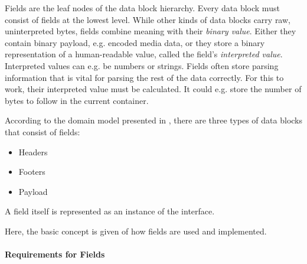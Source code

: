 Fields are the leaf nodes of the data block hierarchy. Every data block must consist of fields at the lowest level. While other kinds of data blocks carry raw, uninterpreted bytes, fields combine meaning with their \emph{binary value}. Either they contain binary payload, e.g. encoded media data, or they store a binary representation of a human-readable value, called the field's \emph{interpreted value}. Interpreted values can e.g. be numbers or strings. Fields often store parsing information that is vital for parsing the rest of the data correctly. For this to work, their interpreted value must be calculated. It could e.g. store the number of bytes to follow in the current container.

According to the domain model presented in , there are three types of data blocks that consist of fields:
\begin{itemize}
	\item Headers
	\item Footers
	\item Payload
\end{itemize}

A field itself is represented as an instance of the \IFField{} interface.

Here, the basic concept is given of how fields are used and implemented.


\paragraph{Requirements for Fields}
\label{sec:RequirementsForFields}

\newcommand{\REQUfieldQueryFields}{\texttt{FIELD\_REQU\_1}}
\newcommand{\REQUfieldInterpValueString}{\texttt{FIELD\_REQU\_2}}
\newcommand{\REQUfieldInterpValueTyped}{\texttt{FIELD\_REQU\_3}}
\newcommand{\REQUfieldBinaryValue}{\texttt{FIELD\_REQU\_4}}
\newcommand{\REQUfieldEfficientReading}{\texttt{FIELD\_REQU\_6}}
\newcommand{\REQUfieldLargeFields}{\texttt{FIELD\_REQU\_5}}
\newcommand{\REQUfieldCustomConversions}{\texttt{FIELD\_REQU\_6}}

